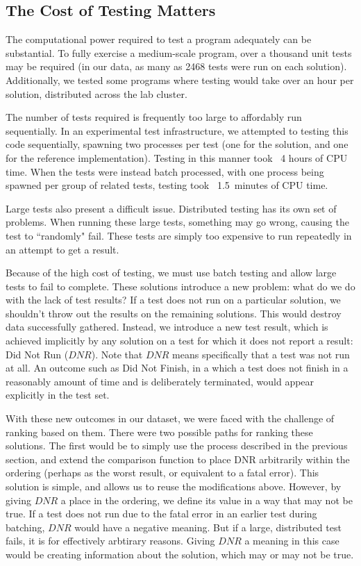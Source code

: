 \documentclass[11pt,twoside]{article}
\newcommand\dnr{\ensuremath{\mathit{DNR}}}
\theoremstyle{definition}
\begin{document}
\subsection{The Cost of Testing Matters}

The computational power required to test a program adequately can be substantial. To fully exercise a medium-scale program, over a thousand unit tests may be required (in our data, as many as 2468 tests were run on each solution). Additionally, we tested some programs where testing would take over an hour per solution, distributed across the lab cluster.

The number of tests required is frequently too large to affordably run sequentially. In an experimental test infrastructure, we attempted to testing this code sequentially, spawning two processes per test (one for the solution, and one for the reference implementation). Testing in this manner took ~4 hours of CPU time. When the tests were instead batch processed, with one process being spawned per group of related tests, testing took ~1.5~minutes of CPU time.

Large tests also present a difficult issue. Distributed testing has its own set of problems. When running these large tests, something may go wrong, causing the test to ``randomly" fail. These tests are simply too expensive to run repeatedly in an attempt to get a result.

Because of the high cost of testing, we must use batch testing and allow large tests to fail to complete. These solutions introduce a new problem: what do we do with the lack of test results? If a test does not run on a particular solution, we shouldn't throw out the results on the remaining solutions. This would destroy data successfully gathered. Instead, we introduce a new test result, which is achieved implicitly by any solution on a test for which it does not report a result: Did Not Run (\dnr). Note that $\dnr$ means specifically that a test was not run at all. An outcome such as Did Not Finish, in a which a test does not finish in a reasonably amount of time and is deliberately terminated, would appear explicitly in the test set.

With these new outcomes in our dataset, we were faced with the challenge of ranking based on them. There were two possible paths for ranking these solutions. The first would be to simply use the process described in the previous section, and extend the comparison function to place DNR arbitrarily within the ordering (perhaps as the worst result, or equivalent to a fatal error). This solution is simple, and allows us to reuse the modifications above. However, by giving $\dnr$ a place in the ordering, we define its value in a way that may not be true. If a test does not run due to the fatal error in an earlier test during batching, $\dnr$ would have a negative meaning. But if a large, distributed test fails, it is for effectively arbtirary reasons. Giving $\dnr$ a meaning in this case would be creating information about the solution, which may or may not be true.
\end{document}
